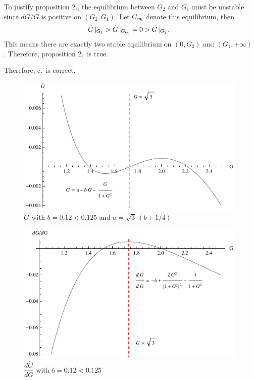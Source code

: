      To justify proposition 2., the equilibrium between $ G_2 $ and $ G_1 $ must be unstable since $ d\dot{G}/G $ is positive on  $ (G_2,G_1) $. Let $ G_{\rm eq} $ denote this equilibrium, then
         \[ \dot{G}\,\vert_{G_1} > \dot{G}\,\vert_{G_{\rm eq}} = 0 >
         \dot{G}\,\vert_{G_2}. \]
     This means there are exactly two stable equilibrium on $ (0,G_2) $ and $ (G_1,+\infty) $. Therefore, proposition 2.\ is true.
    
    Therefore, c.\ is correct.
    
    \begin{figure}[h]
        \centering
        \includegraphics[width=0.7\linewidth]{hw20_challenge_fig1}
        \caption{$ \dot{G} $ with $ b = 0.12 < 0.125 $ and $ a = \sqrt{3}
            \, (b + 1/4) $}
        \label{fig:hw20_challenge_fig1}
    \end{figure}

    \begin{figure}[h]
        \centering
        \includegraphics[width=0.7\linewidth]{hw20_challenge_fig2}
        \caption{$ \dfrac{d\dot{G}}{dG} $ with $ b = 0.12 < 0.125 $}
        \label{fig:hw20_challenge_fig2}
    \end{figure}
    
